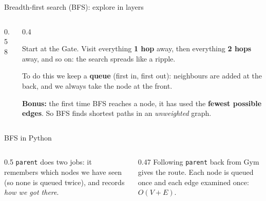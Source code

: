\documentclass[aspectratio=169,10pt]{beamer}
\newcommand{\gA}{white}\newcommand{\gB}{white}\newcommand{\gC}{white}\newcommand{\gD}{white}\newcommand{\gE}{white}\newcommand{\gF}{white}
\newcommand{\campus}[1]{%
  \coordinate (pg) at (0,0); \coordinate (pl) at (2.6,1.5); \coordinate (pc) at (2.6,-1.5);
  \coordinate (pb) at (5.6,1.5); \coordinate (pd) at (5.6,-1.5); \coordinate (py) at (8.2,0);
  \ifnum#1=1
    \draw[tdInk!60] (pg) -- node[wl] {4} (pl); \draw[tdInk!60] (pg) -- node[wl] {2} (pc);
    \draw[tdInk!60] (pl) -- node[wl] {5} (pb); \draw[tdInk!60] (pl) -- node[wl,pos=0.3] {6} (pd);
    \draw[tdInk!60] (pc) -- node[wl] {3} (pd); \draw[tdInk!60] (pb) -- node[wl] {6} (py); \draw[tdInk!60] (pd) -- node[wl] {2} (py);
  \else
    \foreach \u/\v in {pg/pl,pg/pc,pl/pb,pl/pd,pc/pd,pb/py,pd/py}{\draw[tdInk!60] (\u) -- (\v);}
  \fi
  \node[gn,fill=\gA] (gate) at (pg) {Gate}; \node[gn,fill=\gB] (lib) at (pl) {Lib}; \node[gn,fill=\gC] (cafe) at (pc) {Cafe};
  \node[gn,fill=\gD] (lab) at (pb) {Lab}; \node[gn,fill=\gE] (dorm) at (pd) {Dorm}; \node[gn,fill=\gF] (gym) at (py) {Gym};}
\begin{document}
\begin{frame}{Breadth-first search (BFS): explore in layers}
\begin{columns}[T]
\begin{column}{0.58\textwidth}
\begin{sfig}[0.55]
\end{sfig}
\end{column}
\begin{column}{0.4\textwidth}
{\small
Start at the Gate. Visit everything \textbf{1 hop} away, then everything \textbf{2 hops} away, and so on: the search spreads like a ripple.

\vspace{2mm}
To do this we keep a \textbf{queue} (first in, first out): neighbours are added at the back, and we always take the node at the front.

\vspace{2mm}
\textbf{Bonus:} the first time BFS reaches a node, it has used the \textbf{fewest possible edges}. So BFS finds shortest paths in an \emph{unweighted} graph.}
\end{column}
\end{columns}
\end{frame}

\begin{frame}{BFS in Python}
\begin{columns}[T]
\begin{column}{0.5\textwidth}
{\small
\texttt{parent} does two jobs: it remembers which nodes we have seen (so none is queued twice), and records \emph{how we got there}.}
\end{column}
\begin{column}{0.47\textwidth}
\vspace{2mm}
\vspace{2mm}
{\small
Following \texttt{parent} back from Gym gives the route. Each node is queued once and each edge examined once: $O(V+E)$.}
\end{column}
\end{columns}
\end{frame}
\end{document}
